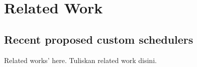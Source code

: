 \chapter{Related Work}
\hspace{0.7cm}

\label{chap:rltwrk} 

\section{Recent proposed custom schedulers}
Related works' here. Tuliskan related work disini.
